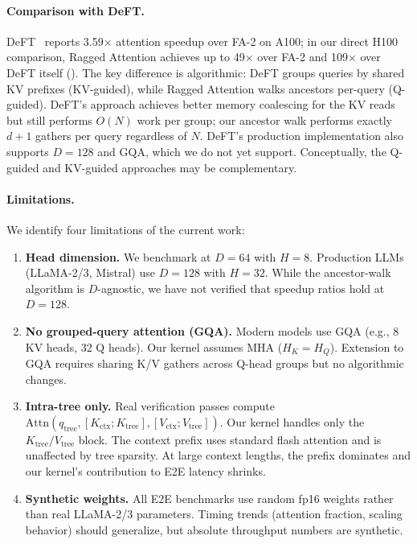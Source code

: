 \documentclass{article}
\newcommand{\method}{Ragged Attention}
\newcommand{\depth}{d}
\newcommand{\headdim}{D}
\newcommand{\nheads}{H}
\begin{document}
\paragraph{Comparison with DeFT.}
DeFT~\cite{yao2024deft} reports 3.59$\times$ attention speedup over
FA-2 on A100; in our direct H100 comparison, \method{} achieves up to
49$\times$ over FA-2 and 109$\times$ over DeFT itself
().
The key difference is algorithmic: DeFT groups queries by shared KV
prefixes (KV-guided), while \method{} walks ancestors per-query
(Q-guided).  DeFT's approach achieves better memory coalescing for the
KV reads but still performs $O(N)$ work per group; our ancestor walk
performs exactly $\depth + 1$ gathers per query regardless of $N$.
DeFT's production implementation also supports $\headdim = 128$ and
GQA, which we do not yet support.
Conceptually, the Q-guided and KV-guided approaches may be
complementary.

\paragraph{Limitations.}
We identify four limitations of the current work:
\begin{enumerate}[leftmargin=*,itemsep=2pt]
  \item \textbf{Head dimension.}
    We benchmark at $\headdim = 64$ with $\nheads = 8$.
    Production LLMs (LLaMA-2/3, Mistral) use $\headdim = 128$ with
    $\nheads = 32$.
    While the ancestor-walk algorithm is $\headdim$-agnostic, we have
    not verified that speedup ratios hold at $\headdim = 128$.
  \item \textbf{No grouped-query attention (GQA).}
    Modern models use GQA (e.g., 8 KV heads, 32 Q heads).
    Our kernel assumes MHA ($\nheads_K = \nheads_Q$).
    Extension to GQA requires sharing K/V gathers across Q-head groups
    but no algorithmic changes.
  \item \textbf{Intra-tree only.}
    Real verification passes compute
    $\text{Attn}(q_{\text{tree}}, [K_{\text{ctx}} ; K_{\text{tree}}],
    [V_{\text{ctx}} ; V_{\text{tree}}])$.
    Our kernel handles only the $K_{\text{tree}} / V_{\text{tree}}$
    block.
    The context prefix uses standard flash attention and is unaffected
    by tree sparsity.
    At large context lengths, the prefix dominates and our kernel's
    contribution to E2E latency shrinks.
  \item \textbf{Synthetic weights.}
    All E2E benchmarks use random fp16 weights rather than real
    LLaMA-2/3 parameters.
    Timing trends (attention fraction, scaling behavior) should
    generalize, but absolute throughput numbers are synthetic.
\end{enumerate}
\end{document}
